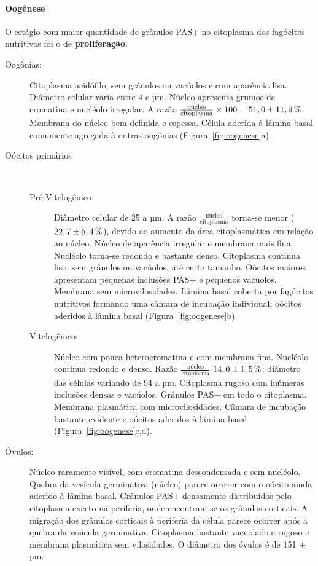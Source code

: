 \paragraph{Oogênese}

O estágio com maior quantidade de grânulos PAS+ no citoplasma dos fagócitos nutritivos foi o de \textbf{proliferação}.

\begin{description}
  \item[Oogônias:] Citoplasma acidófilo, sem grânulos ou vacúolos e com aparência lisa.
  Diâmetro celular varia entre 4 e \unit[11]{µm}.
  Núcleo apresenta grumos de cromatina e nucléolo irregular.
  A razão $\frac{\text{núcleo}}{\text{citoplasma}}\times100=51,0\pm\unit[11,9]{\%}$.
  Membrana do núcleo bem definida e espessa.
  Célula aderida à lâmina basal comumente agregada à outras oogônias (Figura~\ref{fig:oogenese}a).
  \item[Oócitos primários] ~
    \begin{description}
      \item[Pré-Vitelogênico:] Diâmetro celular de 25 a \unit[75]{µm}.
	A razão $\frac{\text{núcleo}}{\text{citoplasma}}$ torna-se menor ($22,7\pm\unit[5,4]{\%}$), devido ao aumento da área citoplasmática em relação ao núcleo.
	Núcleo de aparência irregular e membrana mais fina.
	Nucléolo torna-se redondo e bastante denso.
	Citoplasma continua liso, sem grânulos ou vacúolos, até certo tamanho.
	Oócitos maiores apresentam pequenas inclusões PAS+ e pequenos vacúolos.
	Membrana sem microvilosidades.
	Lâmina basal coberta por fagócitos nutritivos formando uma câmara de incubação individual; oócitos aderidos à lâmina basal (Figura~\ref{fig:oogenese}b).
      \item[Vitelogênico:] Núcleo com pouca heterocromatina e com membrana fina.
	Nucléolo continua redondo e denso.
	Razão $\frac{\text{núcleo}}{\text{citoplasma}}$ $14,0\pm\unit[1,5]{\%}$; diâmetro das células variando de 94 a \unit[129]{µm}.
	Citoplasma rugoso com inúmeras inclusões densas e vacúolos.
	Grânulos PAS+ em todo o citoplasma.
	Membrana plasmática com microvilosidades.
	Câmara de incubação bastante evidente e oócitos aderidos à lâmina basal (Figura~\ref{fig:oogenese}c,d).
    \end{description}
  \item[Óvulos:] Núcleo raramente visível, com cromatina descondensada e sem nucléolo.
    Quebra da vesícula germinativa (núcleo) parece ocorrer com o oócito ainda aderido à lâmina basal.
    Grânulos PAS+ densamente distribuídos pelo citoplasma exceto na periferia, onde encontram-se os grânulos corticais.
    A migração dos grânulos corticais à periferia da célula parece ocorrer após a quebra da vesícula germinativa.
    Citoplasma bastante vacuolado e rugoso e membrana plasmática sem vilosidades.
    O diâmetro dos óvulos é de 151 $\pm$ \unit[8]{µm}.
\end{description}

